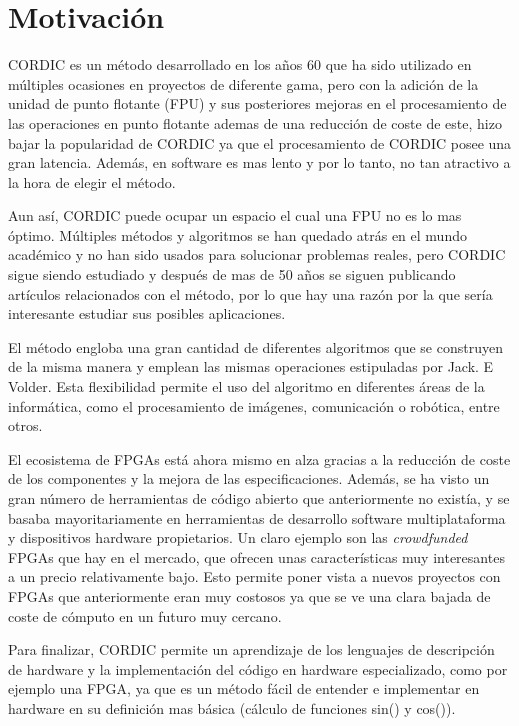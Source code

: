 \chapter{Motivación}
\label{motivacion}

CORDIC es un método desarrollado en los años 60 que ha sido utilizado en múltiples ocasiones en proyectos de diferente gama, pero con la adición de la unidad de punto flotante (FPU) y sus posteriores mejoras en el procesamiento de las operaciones en punto flotante ademas de una reducción de coste de este, hizo bajar la popularidad de CORDIC ya que el procesamiento de CORDIC posee una gran latencia. Además, en software es mas lento y por lo tanto, no tan atractivo a la hora de elegir el método.

Aun así, CORDIC puede ocupar un espacio el cual una FPU no es lo mas óptimo. Múltiples métodos y algoritmos se han quedado atrás en el mundo académico y no han sido usados para solucionar problemas reales, pero CORDIC sigue siendo estudiado y después de mas de 50 años se siguen publicando artículos relacionados con el método, por lo que hay una razón por la que sería interesante estudiar sus posibles aplicaciones.

El método engloba una gran cantidad de diferentes algoritmos que se construyen de la misma manera y emplean las mismas operaciones estipuladas por Jack. E Volder. Esta flexibilidad permite el uso del algoritmo en diferentes áreas de la informática, como el procesamiento de imágenes, comunicación o robótica, entre otros.

El ecosistema de FPGAs está ahora mismo en alza gracias a la reducción de coste de los componentes y la mejora de las especificaciones. Además, se ha visto un gran número de herramientas de código abierto que anteriormente no existía, y se basaba mayoritariamente en herramientas de desarrollo software multiplataforma y dispositivos hardware propietarios. Un claro ejemplo son las \textit{crowdfunded} FPGAs que hay en el mercado, que ofrecen unas características muy interesantes a un precio relativamente bajo. Esto permite poner vista a nuevos proyectos con FPGAs que anteriormente eran muy costosos ya que se ve una clara bajada de coste de cómputo en un futuro muy cercano.

Para finalizar, CORDIC permite un aprendizaje de los lenguajes de descripción de hardware y la implementación del código en hardware especializado, como por ejemplo una FPGA, ya que es un método fácil de entender e implementar en hardware en su definición mas básica (cálculo de funciones sin() y cos()).
